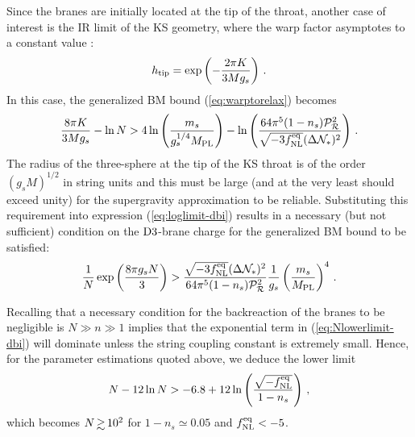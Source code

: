Since the branes are initially located at the tip of the 
throat, another case of interest is the IR limit of the KS geometry, where 
the warp factor asymptotes to a constant value 
\cite{gkp}:
% 
\begin{equation}
\label{eq:KStip-dbi}
h_{\rm tip} = \exp \left( - \frac{2\pi K}{3Mg_s} \right) \,.
\end{equation}
% 
In this case, the generalized BM bound (\ref{eq:warptorelax}) becomes
%  
\begin{equation}
\label{eq:loglimit-dbi}
\frac{8\pi K}{3Mg_s} -\ln N > 4 \ln \left( \frac{m_s}{g_s^{1/4}M_{\mathrm{PL}}} \right)
-\ln \left( 
\frac{64\pi^5 (1-n_s)\mathcal{P}_{\mathcal{R}}^2 }{\sqrt{-3f_{\mathrm{NL}}^{\mathrm{eq}}} ( \Delta \mathcal{N}_*)^2}
\right) \,.
\end{equation}
% 
The radius of the three-sphere at the tip of the KS 
throat is of the order $(g_sM)^{1/2}$ in string units 
and this must be large (and at the very least should exceed
unity) for the supergravity approximation to be reliable. 
Substituting this requirement into expression (\ref{eq:loglimit-dbi}) 
results in a necessary (but not sufficient) condition 
on the ${\rm D3}$-brane charge for the 
generalized BM bound to be satisfied:
%  
\begin{equation}
\label{eq:Nlowerlimit-dbi}
\frac{1}{N} \exp \left( \frac{8\pi g_s N}{3}  \right)
> \frac{\sqrt{-3f_{\mathrm{NL}}^{\mathrm{eq}}} ( \Delta \mathcal{N}_*)^2}{64\pi^5 
(1-n_s)\mathcal{P}_{\mathcal{R}}^2 } \frac{1}{g_s} \left( \frac{m_s}{M_{\mathrm{PL}}} \right)^4 \,.
\end{equation}
% 


Recalling that a necessary condition for the backreaction 
of the branes to be negligible is 
$N \gg n \gg 1$ implies that the 
exponential term in (\ref{eq:Nlowerlimit-dbi}) will dominate unless 
the string coupling constant is extremely small. Hence, for 
the parameter estimations quoted above, we 
deduce the lower limit 
% 
\begin{equation}
\label{eq:Nconstraint-dbi}
N- 12 \ln N > -6.8 +12 \ln \left( \frac{\sqrt{-f_{\mathrm{NL}}^{\mathrm{eq}}}}{1-n_s} \right) \,,
\end{equation}
% 
which becomes $N \, \gsim \, 10^2$ for $1-n_s \simeq 0.05$ and $f_{\mathrm{NL}}^{\mathrm{eq}}<-5$.


